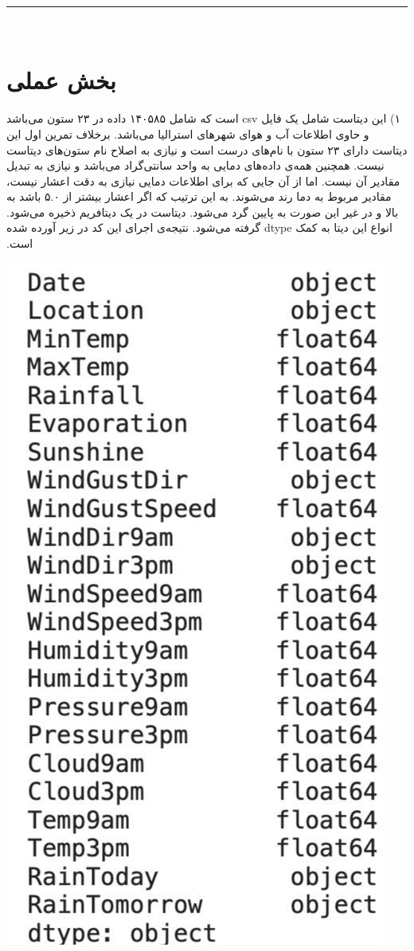 ‫‫\vspace{1cm}
‫
‫\hrule height .4 pt depth 0 pt width 16 cm \relax
‫
‫‫%
‫
‫‫‫\section*{بخش عملی}
‫
‫۱) این دیتاست شامل یک فایل csv است که شامل ۱۴۰۵۸۵ داده در ۲۳ ستون می‌باشد و حاوی اطلاعات آب و هوای شهرهای استرالیا می‌باشد. برخلاف تمرین اول این دیتاست دارای ۲۳ ستون با نام‌های درست است و نیازی به اصلاح نام ستون‌های دیتاست نیست. همچنین همه‌ی داده‌های دمایی به واحد سانتی‌گراد می‌باشد و نیازی به تبدیل مقادیر آن نیست. اما از آن جایی که برای اطلاعات دمایی نیازی به دقت اعشار نیست، مقادیر مربوط به دما رند می‌شوند. به این ترتیب که اگر اعشار بیشتر از ۵.۰ باشد به بالا و در غیر این صورت به پایین گرد می‌شود. \newline
‫دیتاست در یک دیتافریم ذخیره می‌شود. انواع این دیتا به کمک dtype گرفته می‌شود. نتیجه‌ی اجرای این کد در زیر آورده شده است.
‫
‫\begin{center}
‫\includegraphics[scale=0.35]{figs/dtype1.png}
‫\end{center}
